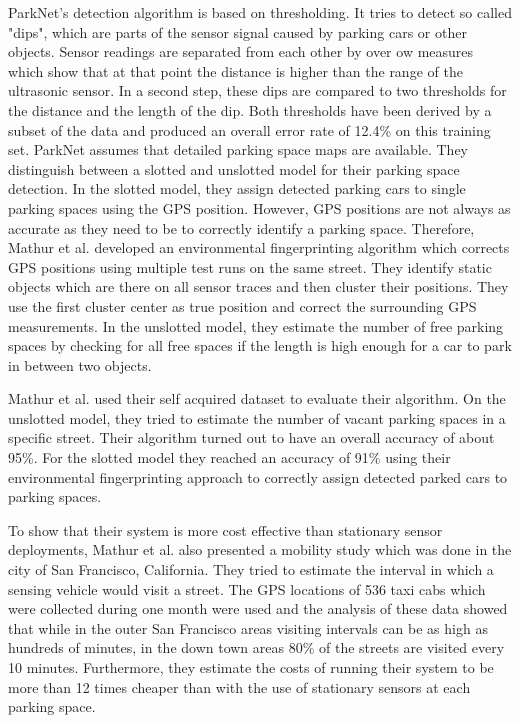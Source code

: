 ParkNet's detection algorithm is based on thresholding. It tries to detect so called "dips", which are parts of the sensor signal caused by parking cars or other objects. Sensor readings are separated from each other by over ow measures which show that at that point the distance is higher than the range of the ultrasonic sensor. In a second step, these dips are compared to two thresholds for the distance and the length of the dip. Both thresholds have been derived by a subset of the data and produced an overall error rate of 12.4\% on this training set. ParkNet assumes that detailed parking space maps are available. They distinguish between a slotted and unslotted model for their parking space detection. In the slotted model, they assign detected parking cars to single parking spaces using the GPS position. However, GPS positions are not always as accurate as they need to be to correctly identify a parking space. Therefore, Mathur et al. developed an environmental fingerprinting algorithm which corrects GPS positions using multiple test runs on the same street. They identify static objects which are there on all sensor traces and then cluster their positions. They use the first cluster center as true position and correct the surrounding GPS measurements. In the unslotted model, they estimate the number of free parking spaces by checking for all free spaces if the length is high enough for a car to park in between two objects.

Mathur et al. used their self acquired dataset to evaluate their algorithm. On the unslotted model, they tried to estimate the number of vacant parking spaces in a specific street. Their algorithm turned out to have an overall accuracy of about 95\%. For the slotted model they reached an accuracy of 91\% using their environmental fingerprinting approach to correctly assign detected parked cars to parking spaces.

To show that their system is more cost effective than stationary sensor deployments, Mathur et al. also presented a mobility study which was done in the city of San Francisco, California. They tried to estimate the interval in which a sensing vehicle would visit a street. The GPS locations of 536 taxi cabs which were collected during one month were used and the analysis of these data showed that while in the outer San Francisco areas visiting intervals can be as high as hundreds of minutes, in the down town areas 80\% of the streets are visited every 10 minutes. Furthermore, they estimate the costs of running their system to be more than 12 times cheaper than with the use of stationary sensors at each parking space.


